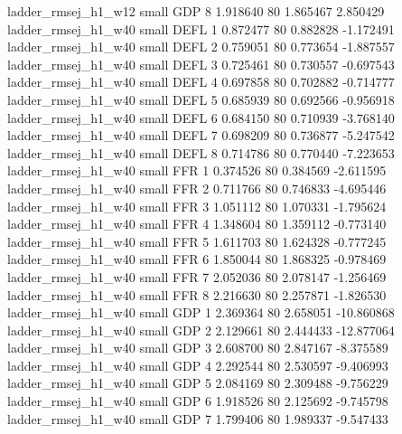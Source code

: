      ladder_rmsej_h1_w12      small      GDP                 8 1.918640 80       1.865467           2.850429
     ladder_rmsej_h1_w40      small     DEFL                 1 0.872477 80       0.882828          -1.172491
     ladder_rmsej_h1_w40      small     DEFL                 2 0.759051 80       0.773654          -1.887557
     ladder_rmsej_h1_w40      small     DEFL                 3 0.725461 80       0.730557          -0.697543
     ladder_rmsej_h1_w40      small     DEFL                 4 0.697858 80       0.702882          -0.714777
     ladder_rmsej_h1_w40      small     DEFL                 5 0.685939 80       0.692566          -0.956918
     ladder_rmsej_h1_w40      small     DEFL                 6 0.684150 80       0.710939          -3.768140
     ladder_rmsej_h1_w40      small     DEFL                 7 0.698209 80       0.736877          -5.247542
     ladder_rmsej_h1_w40      small     DEFL                 8 0.714786 80       0.770440          -7.223653
     ladder_rmsej_h1_w40      small      FFR                 1 0.374526 80       0.384569          -2.611595
     ladder_rmsej_h1_w40      small      FFR                 2 0.711766 80       0.746833          -4.695446
     ladder_rmsej_h1_w40      small      FFR                 3 1.051112 80       1.070331          -1.795624
     ladder_rmsej_h1_w40      small      FFR                 4 1.348604 80       1.359112          -0.773140
     ladder_rmsej_h1_w40      small      FFR                 5 1.611703 80       1.624328          -0.777245
     ladder_rmsej_h1_w40      small      FFR                 6 1.850044 80       1.868325          -0.978469
     ladder_rmsej_h1_w40      small      FFR                 7 2.052036 80       2.078147          -1.256469
     ladder_rmsej_h1_w40      small      FFR                 8 2.216630 80       2.257871          -1.826530
     ladder_rmsej_h1_w40      small      GDP                 1 2.369364 80       2.658051         -10.860868
     ladder_rmsej_h1_w40      small      GDP                 2 2.129661 80       2.444433         -12.877064
     ladder_rmsej_h1_w40      small      GDP                 3 2.608700 80       2.847167          -8.375589
     ladder_rmsej_h1_w40      small      GDP                 4 2.292544 80       2.530597          -9.406993
     ladder_rmsej_h1_w40      small      GDP                 5 2.084169 80       2.309488          -9.756229
     ladder_rmsej_h1_w40      small      GDP                 6 1.918526 80       2.125692          -9.745798
     ladder_rmsej_h1_w40      small      GDP                 7 1.799406 80       1.989337          -9.547433
